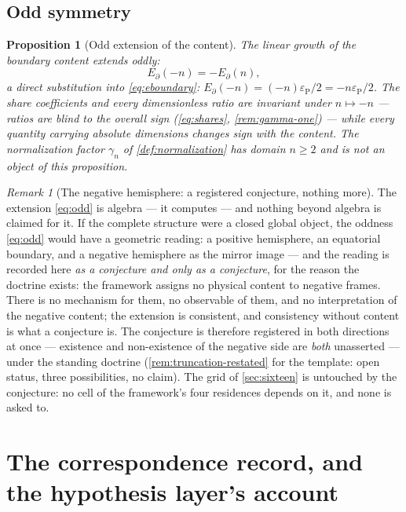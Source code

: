 \documentclass[11pt]{amsbook}
\theoremstyle{plain}
\newtheorem{proposition}[theorem]{Proposition}
\theoremstyle{definition}
\theoremstyle{remark}
\newtheorem{remark}[theorem]{Remark}
\newcommand{\uses}[1]{\par\nopagebreak\noindent{\footnotesize\emph{Uses: #1.}\par}}
\begin{document}
\subsection{Odd symmetry}\label{sec:odd-symmetry}

\begin{proposition}[Odd extension of the content]\label{prop:odd}
The linear growth of the boundary content extends oddly:
\begin{equation}\label{eq:odd}
E_{\partial}(-n) = -E_{\partial}(n),
\end{equation}
a direct substitution into \cref{eq:eboundary}: $E_{\partial}(-n) = (-n)\varepsilon_{\mathrm P}/2 = -n\varepsilon_{\mathrm P}/2$. The share coefficients and every dimensionless ratio are invariant under $n \mapsto -n$ --- ratios are blind to the overall sign (\cref{eq:shares}, \cref{rem:gamma-one}) --- while every quantity carrying absolute dimensions changes sign with the content. The normalization factor $\gamma_{n}$ of \cref{def:normalization} has domain $n \geq 2$ and is not an object of this proposition.
\uses{\cref{eq:eboundary}, \cref{eq:shares}}
\end{proposition}

\begin{remark}[The negative hemisphere: a registered conjecture, nothing more]\label{rem:negative-conjecture}
The extension \cref{eq:odd} is algebra --- it computes --- and nothing beyond algebra is claimed for it. If the complete structure were a closed global object, the oddness \cref{eq:odd} would have a geometric reading: a positive hemisphere, an equatorial boundary, and a negative hemisphere as the mirror image --- and the reading is recorded here \emph{as a conjecture and only as a conjecture}, for the reason the doctrine exists: the framework assigns no physical content to negative frames. There is no mechanism for them, no observable of them, and no interpretation of the negative content; the extension is consistent, and consistency without content is what a conjecture is. The conjecture is therefore registered in both directions at once --- existence and non-existence of the negative side are \emph{both} unasserted --- under the standing doctrine (\cref{rem:truncation-restated} for the template: open status, three possibilities, no claim). The grid of \cref{sec:sixteen} is untouched by the conjecture: no cell of the framework's four residences depends on it, and none is asked to.
\end{remark}

\section{The correspondence record, and the hypothesis layer's account}\label{sec:correspondence}
\end{document}
